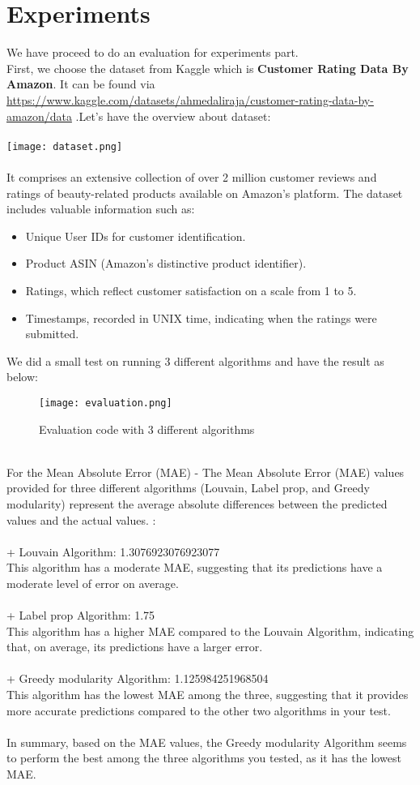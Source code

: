 \section{Experiments}
We have proceed to do an evaluation for experiments part.\\
First, we choose the dataset from Kaggle which is \textbf{Customer Rating Data By Amazon}. It can be found via \url{https://www.kaggle.com/datasets/ahmedaliraja/customer-rating-data-by-amazon/data} .Let's have the overview about dataset:\\
\\
\texttt{[image: dataset.png]}
\\
\\
It comprises an extensive collection of over 2 million customer reviews and ratings of beauty-related products available on Amazon's platform. The dataset includes valuable information such as:
\begin{itemize}
    \item Unique User IDs for customer identification.
    \item Product ASIN (Amazon's distinctive product identifier).
    \item Ratings, which reflect customer satisfaction on a scale from 1 to 5.
    \item Timestamps, recorded in UNIX time, indicating when the ratings were submitted.
\end{itemize}
\indent  We did a small test on running 3 different algorithms and have the result as below:
\begin{figure}
    \centering
    \texttt{[image: evaluation.png]}
    \caption{Evaluation code with 3 different algorithms}
    \label{fig:enter-label}
\end{figure}
\\
\indent For the Mean Absolute Error (MAE) - 
The Mean Absolute Error (MAE) values provided for three different algorithms (Louvain, Label prop, and Greedy modularity) represent the average absolute differences between the predicted values and the actual values. : \\ \\
+ Louvain Algorithm: 1.3076923076923077 \\
This algorithm has a moderate MAE, suggesting that its predictions have a moderate level of error on average.\\
\\
+ Label prop Algorithm: 1.75 \\
This algorithm has a higher MAE compared to the Louvain Algorithm, indicating that, on average, its predictions have a larger error.\\
\\
+ Greedy modularity Algorithm: 1.125984251968504 \\
This algorithm has the lowest MAE among the three, suggesting that it provides more accurate predictions compared to the other two algorithms in your test.\\
\\
\indent In summary, based on the MAE values, the Greedy modularity Algorithm seems to perform the best among the three algorithms you tested, as it has the lowest MAE. 
